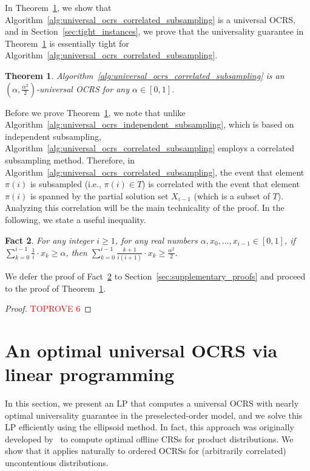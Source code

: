 \documentclass[11pt]{article}
\newtheorem{theorem}{Theorem}[section]
\newtheorem{fact}[theorem]{Fact}
\begin{document}
In Theorem~\ref{thm:universal_ocrs_correlated_subsampling}, we show that Algorithm~\ref{alg:universal_ocrs_correlated_subsampling} is a universal OCRS, and in Section~\ref{sec:tight_instances}, we prove that the universality guarantee in Theorem~\ref{thm:universal_ocrs_correlated_subsampling} is essentially tight for Algorithm~\ref{alg:universal_ocrs_correlated_subsampling}.
\begin{theorem}\label{thm:universal_ocrs_correlated_subsampling}
Algorithm~\ref{alg:universal_ocrs_correlated_subsampling} is an $(\alpha,\frac{\alpha^2}{2})$-universal OCRS for any $\alpha\in[0,1]$.
\end{theorem}
Before we prove Theorem~\ref{thm:universal_ocrs_correlated_subsampling}, we note that unlike Algorithm~\ref{alg:universal_ocrs_independent_subsampling}, which is based on independent subsampling, Algorithm~\ref{alg:universal_ocrs_correlated_subsampling} employs a correlated subsampling method. Therefore, in Algorithm~\ref{alg:universal_ocrs_correlated_subsampling}, the event that element $\pi(i)$ is subsampled (i.e., $\pi(i)\in T$) is correlated with the event that element $\pi(i)$ is spanned by the partial solution set $X_{i-1}$ (which is a subset of $T$). Analyzing this correlation will be the main technicality of the proof. In the following, we state a useful inequality.
\begin{fact}\label{fact:fractional_knapsack}
For any integer $i\ge1$, for any real numbers $\alpha,x_0,\dots,x_{i-1}\in[0,1]$, if $\sum_{k=0}^{i-1}\frac{1}{i}\cdot x_{k}\ge\alpha$, then $\sum_{k=0}^{i-1} \frac{k+1}{i(i+1)}\cdot x_{k}\ge\frac{\alpha^2}{2}$.
\end{fact}
We defer the proof of Fact~\ref{fact:fractional_knapsack} to Section~\ref{sec:supplementary_proofs} and proceed to the proof of Theorem~\ref{thm:universal_ocrs_correlated_subsampling}.
\begin{proof}\textcolor{red}{TOPROVE 6}\end{proof} 
\section{An optimal universal OCRS via linear programming}\label{sec:ocrs_lp}
In this section, we present an LP that computes a universal OCRS with nearly optimal universality guarantee in the preselected-order model, and we solve this LP efficiently using the ellipsoid method. In fact, this approach was originally developed by~\citet{chekuri2014submodular} to compute optimal offline CRSs for product distributions. We show that it applies naturally to ordered OCRSs for (arbitrarily correlated) uncontentious distributions.
\end{document}
